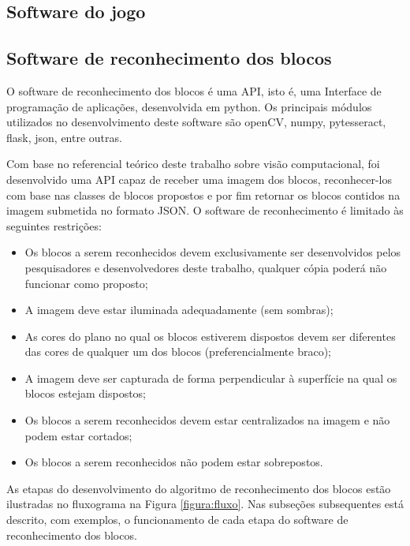     \subsection{Software do jogo}
    
    \subsection{Software de reconhecimento dos blocos}
    
    O software de reconhecimento dos blocos é uma API, isto é, uma Interface de programação de aplicações,  desenvolvida em python. Os principais módulos utilizados no desenvolvimento deste software são openCV, numpy, pytesseract, flask, json, entre outras.

    Com base no referencial teórico deste trabalho sobre visão computacional, foi desenvolvido uma API capaz de receber uma imagem dos blocos, reconhecer-los com base nas classes de blocos propostos e por fim retornar os blocos contidos na imagem submetida no formato JSON. O software de reconhecimento é limitado às seguintes restrições:
    
        \begin{itemize}
        \item Os blocos a serem reconhecidos devem exclusivamente ser desenvolvidos pelos pesquisadores e desenvolvedores deste trabalho, qualquer cópia poderá não funcionar como proposto;
        \item A imagem deve estar iluminada adequadamente (sem sombras);
        \item As cores do plano no qual os blocos estiverem dispostos devem ser diferentes das cores de qualquer um dos blocos (preferencialmente braco);
        \item A imagem deve ser capturada de forma perpendicular à superfície na qual os blocos estejam dispostos;
       \item Os blocos a serem reconhecidos devem estar centralizados na imagem e não podem estar cortados;
      \item Os blocos a serem reconhecidos não podem estar sobrepostos.
    \end{itemize}

    As etapas do desenvolvimento do algoritmo de reconhecimento dos blocos estão ilustradas no fluxograma na Figura \ref{figura:fluxo}. 
    Nas subseções subsequentes está descrito, com exemplos, o funcionamento de cada etapa do software de reconhecimento dos blocos.
    
